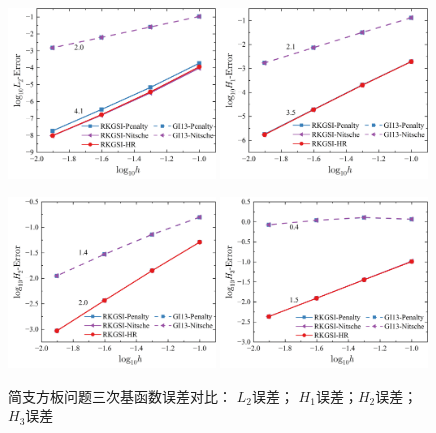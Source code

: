 \begin{figure}[H]
    \centering
    \begin{subcaptiongroup}
    \includegraphics[width=0.49\textwidth]{figure/PHR/R/CL2.png}
    \label{CL2}
    \includegraphics[width=0.49\textwidth]{figure/PHR/R/CH1.png}
    \label{CH1}
    \end{subcaptiongroup}
    \begin{subcaptiongroup}
    \includegraphics[width=0.49\textwidth]{figure/PHR/R/CH2.png}
    \label{CH2}
    \includegraphics[width=0.49\textwidth]{figure/PHR/R/CH3.png}
    \label{CH3}
    \end{subcaptiongroup}
\caption{简支方板问题三次基函数误差对比： $L_2$误差； $H_1$误差；$H_2$误差； $H_3$误差}
\label{RCLH}
\end{figure}
